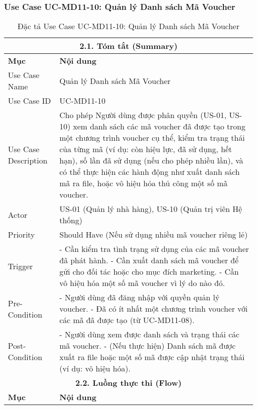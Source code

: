 \subsubsection{Use Case UC-MD11-10: Quản lý Danh sách Mã Voucher}
\begin{longtable}{|m{4cm}|p{11cm}|}
\caption{Đặc tả Use Case UC-MD11-10: Quản lý Danh sách Mã Voucher} \label{tab:uc_md11_10_manage_voucher_codes} \\
\hline
\multicolumn{2}{|c|}{\textbf{2.1. Tóm tắt (Summary)}} \\
\hline
\textbf{Mục} & \textbf{Nội dung} \\
\hline
\endhead
\midrule
\endfoot
\bottomrule
\endlastfoot
Use Case Name & Quản lý Danh sách Mã Voucher \\
\hline
Use Case ID & UC-MD11-10 \\
\hline
Use Case Description & Cho phép Người dùng được phân quyền (US-01, US-10) xem danh sách các mã voucher đã được tạo trong một chương trình voucher cụ thể, kiểm tra trạng thái của từng mã (ví dụ: còn hiệu lực, đã sử dụng, hết hạn), số lần đã sử dụng (nếu cho phép nhiều lần), và có thể thực hiện các hành động như xuất danh sách mã ra file, hoặc vô hiệu hóa thủ công một số mã voucher. \\
\hline
Actor & US-01 (Quản lý nhà hàng), US-10 (Quản trị viên Hệ thống) \\
\hline
Priority & Should Have (Nếu sử dụng nhiều mã voucher riêng lẻ) \\
\hline
Trigger & - Cần kiểm tra tình trạng sử dụng của các mã voucher đã phát hành. \newline - Cần xuất danh sách mã voucher để gửi cho đối tác hoặc cho mục đích marketing. \newline - Cần vô hiệu hóa một số mã voucher vì lý do nào đó. \\
\hline
Pre-Condition & - Người dùng đã đăng nhập với quyền quản lý voucher. \newline - Đã có ít nhất một chương trình voucher với các mã đã được tạo (từ UC-MD11-08). \\
\hline
Post-Condition & - Người dùng xem được danh sách và trạng thái các mã voucher. \newline - (Nếu thực hiện) Danh sách mã được xuất ra file hoặc một số mã được cập nhật trạng thái (ví dụ: vô hiệu hóa). \\
\hline
\multicolumn{2}{|c|}{\textbf{2.2. Luồng thực thi (Flow)}} \\
\hline
\textbf{Mục} & \textbf{Nội dung} \\

\end{longtable}
